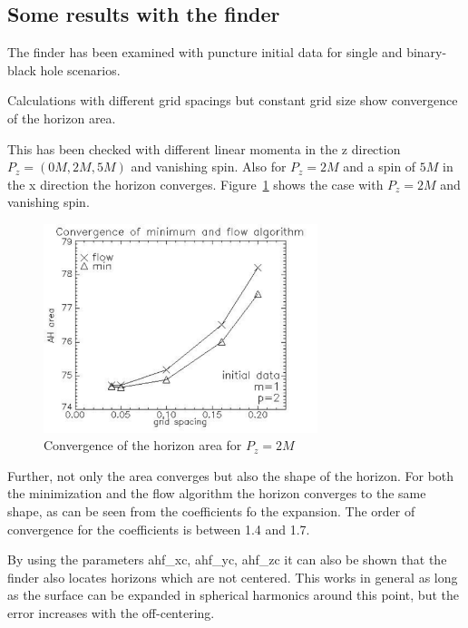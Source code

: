 \subsection{Some results with the finder}
The finder has been examined with puncture initial data for single and
binary-black hole scenarios.

Calculations with different grid spacings but constant grid size show
convergence of the horizon area.

This has been checked with different linear momenta in the z direction
$P_{z}=(0M,2M,5M)$ and vanishing spin. Also for $P_{z}=2M$ and a spin of $5M$
in the x direction the horizon converges. 
Figure~\ref{CactusEistein_AHFinder_p2_conv} shows the case with
$P_{z}=2M$ and vanishing spin.

\begin{figure}[ht]
\begin{center}
\includegraphics[angle=0,width=8cm]{p2_areacomp}
\end{center}
\caption{Convergence of the horizon area for $P_{z}=2M$}
\label{CactusEistein_AHFinder_p2_conv}
\end{figure}

Further, not only the area converges but also the shape of the horizon.
For both the minimization and the flow algorithm the horizon converges to
the same shape, as can be seen from the coefficients fo the expansion.
The order of convergence for the coefficients is between 1.4 and 1.7.

By using the parameters ahf\_xc, ahf\_yc, ahf\_zc it can also be shown that
the finder also locates horizons which are not centered. This works in
general as long as the surface can be expanded in spherical harmonics
around this point, but the error increases with the off-centering.

